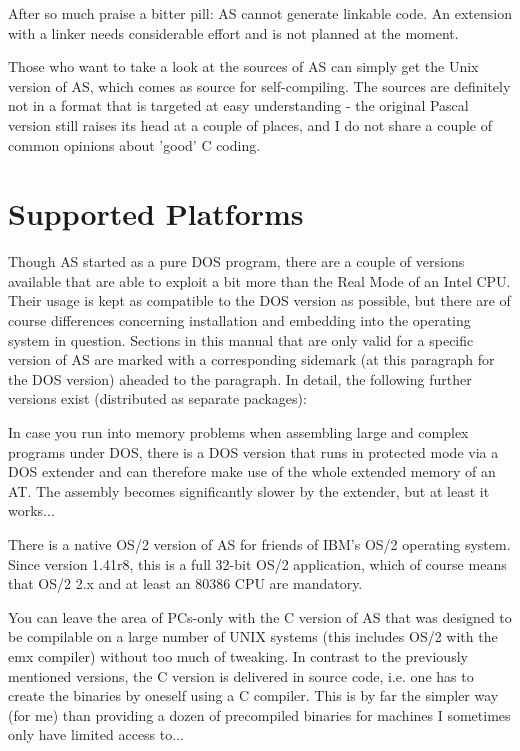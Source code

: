 \documentclass[12pt,twoside]{report}
\newcommand{\asname}{{AS}}
\begin{document}
After so much praise a bitter pill: \asname{} cannot generate linkable code.
An extension with a linker needs considerable effort and is not planned
at the moment.

Those who want to take a look at the sources of \asname{} can simply get the
Unix version of \asname{}, which comes as source for self-compiling.  The sources
are definitely not in a format that is targeted at easy understanding -
the original Pascal version still raises its head at a couple of places,
and I do not share a couple of common opinions about 'good' C coding.


\section{Supported Platforms}

Though \asname{} started as a pure DOS  program, there are a
couple of versions available that are able to exploit a bit more than the
Real Mode of an Intel CPU.  Their usage is kept as compatible to the DOS
version as possible, but there are of course differences concerning
installation and embedding into the operating system in question.
Sections in this manual that are only valid for a specific version of \asname{}
are marked with a corresponding sidemark (at this paragraph for the DOS
version) aheaded to the paragraph.  In detail, the following further
versions exist (distributed as separate packages):

In case you run into memory problems when assembling
large and complex programs under DOS, there is a DOS version that runs in
protected mode via a DOS extender and can therefore make use of the whole
extended memory of an AT.  The assembly becomes significantly slower by
the extender, but at least it works...

There is a native OS/2  version of \asname{} for friends of
IBM's OS/2 operating system.  Since version 1.41r8, this is a full 32-bit
OS/2 application, which of course means that OS/2 2.x and at least an
80386 CPU are mandatory.

You can leave  the area of PCs-only with the C
version of \asname{} that was designed to be compilable on a large number of UNIX
systems (this includes OS/2 with the emx compiler) without too much of
tweaking.  In contrast to the previously mentioned versions, the C version
is delivered in source code, i.e. one has to create the binaries by
oneself using a C compiler.  This is by far the simpler way (for me) than
providing a dozen of precompiled binaries for machines I sometimes only
have limited access to...
\end{document}
